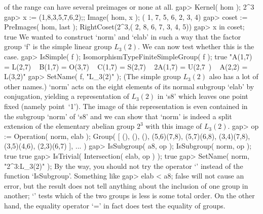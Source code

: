of the range can have several preimages or none at all.
\beginexample
    gap> Kernel( hom );
    2^3
    gap> x := (1,8,3,5,7,6,2);; Image( hom, x );
    ( 1, 7, 5, 6, 2, 3, 4)
    gap> coset := PreImages( hom, last );
    RightCoset(2^3,( 2, 8, 6, 7, 3, 4, 5))
    gap> x in coset;
    true
\endexample
We  wanted to construct  `norm' and `elab' in such  a way that the factor
group `f'  is the simple linear group  $L_3(2)$. We  can now test whether
this is the case.
\beginexample
    gap> IsSimple( f ); IsomorphismTypeFiniteSimpleGroup( f );
    true
    "A(1,7) = L(2,7) ~ B(1,7) = O(3,7) ~ C(1,7) = S(2,7) ~ 2A(1,7) = U(2,7\
    ) ~ A(2,2) = L(3,2)"
    gap> SetName( f, "L_3(2)" );
\endexample
(The simple group $L_3(2)$ also has a lot of other names.) `norm' acts on
the eight elements of its normal subgroup `elab' by conjugation, yielding
a representation of $L_3(2)$ in `s8' which leaves one point fixed (namely
point~`1').  The image of this  representation  is even contained in  the
subgroup `norm'  of `s8' and we  can show that  `norm' is indeed  a split
extension of   the  elementary abelian group   $2^3$ with  this image  of
$L_3(2)$.
\beginexample
    gap> op := Operation( norm, elab );
    Group( [ (), (), (), (5,6)(7,8), (5,7)(6,8), (3,4)(7,8), (3,5)(4,6), 
      (2,3)(6,7) ], ... )
    gap> IsSubgroup( a8, op ); IsSubgroup( norm, op );
    true
    true
    gap> IsTrivial( Intersection( elab, op ) );
    true
    gap> SetName( norm, "2^3:L_3(2)" );
\endexample
By the way, you should not try the operator `\<'  instead of the function
`IsSubgroup'. Something like
\beginexample
    gap> elab < a8;
    false
\endexample
will not cause an error, but the result does not  tell anything about the
inclusion of one group in another; `\<' tests  which of the two groups is
less is some total order. On the other hand, the equality operator `=' in
fact does test the equality of groups.

\Section{Operations!of groups}

